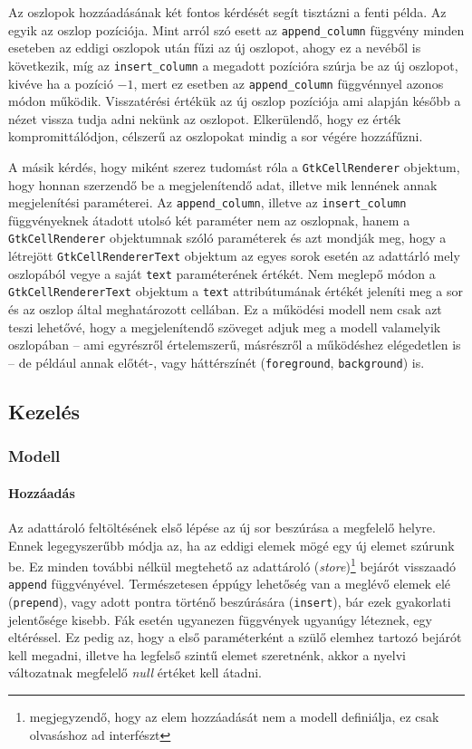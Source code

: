 Az oszlopok hozzáadásának két fontos kérdését segít tisztázni a fenti példa. Az egyik az oszlop pozíciója. Mint arról szó esett az \texttt{append\_column} függvény minden eseteben az eddigi oszlopok után fűzi az új oszlopot, ahogy ez a nevéből is következik, míg az \texttt{insert\_column} a megadott pozícióra szúrja be az új oszlopot, kivéve ha a pozíció $-1$, mert ez esetben az \texttt{append\_column} függvénnyel azonos módon működik. Visszatérési értékük az új oszlop pozíciója ami alapján később a nézet vissza tudja adni nekünk az oszlopot. Elkerülendő, hogy ez érték kompromittálódjon, célszerű az oszlopokat mindig a sor végére hozzáfűzni.

A másik kérdés, hogy miként szerez tudomást róla a \texttt{GtkCellRenderer} objektum, hogy honnan szerzendő be a megjelenítendő adat, illetve mik lennének annak megjelenítési paraméterei. Az \texttt{append\_column}, illetve az \texttt{insert\_column} függvényeknek átadott utolsó két paraméter nem az oszlopnak, hanem a \texttt{GtkCellRenderer} objektumnak szóló paraméterek és azt mondják meg, hogy a létrejött \texttt{GtkCellRendererText} objektum az egyes sorok esetén az adattárló mely oszlopából vegye a saját \texttt{text} paraméterének értékét. Nem meglepő módon a \texttt{GtkCellRendererText} objektum a \texttt{text} attribútumának értékét jeleníti meg a sor és az oszlop által meghatározott cellában. Ez a működési modell nem csak azt teszi lehetővé, hogy a megjelenítendő szöveget adjuk meg a modell valamelyik oszlopában -- ami egyrészről értelemszerű, másrészről a működéshez elégedetlen is -- de például annak előtét-, vagy háttérszínét (\texttt{foreground}, \texttt{background}) is.

\subsection{Kezelés}

\subsubsection{Modell}

\paragraph{Hozzáadás}

Az adattároló feltöltésének első lépése az új sor beszúrása a megfelelő helyre. Ennek legegyszerűbb módja az, ha az eddigi elemek mögé egy új elemet szúrunk be. Ez minden további nélkül megtehető az adattároló (\textit{store})\footnote{megjegyzendő, hogy az elem hozzáadását nem a modell definiálja, ez csak olvasáshoz ad interfészt} bejárót visszaadó \texttt{append} függvényével. Természetesen éppúgy lehetőség van a meglévő elemek elé (\texttt{prepend}), vagy adott pontra történő beszúrására (\texttt{insert}), bár ezek gyakorlati jelentősége kisebb. Fák esetén ugyanezen függvények ugyanúgy léteznek, egy eltéréssel. Ez pedig az, hogy a első paraméterként a szülő elemhez tartozó bejárót kell megadni, illetve ha legfelső szintű elemet szeretnénk, akkor a nyelvi változatnak megfelelő \textit{null} értéket kell átadni.

